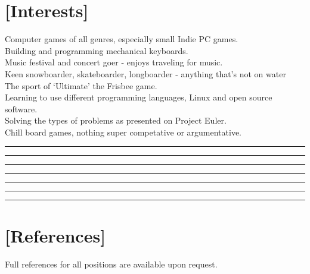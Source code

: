 \documentclass[a4paper]{res}
\newcommand{\setrule}[1]{\rule{#1}{1mm}}
\newcommand{\fibrule}[2]{ \hspace{#1}  \setrule{#2} \setrule{21mm} \setrule{13mm} \setrule{8mm} \setrule{5mm} \setrule{3mm} \setrule{2mm}  \vspace{-.52in} }
\begin{document}
\begin{resume}
\section{[Interests]} 
\vspace{-.15in}

Computer games of all genres, especially small Indie PC games.\\
Building and programming mechanical keyboards.\\
Music festival and concert goer - enjoys traveling for music. \\
Keen snowboarder, skateboarder, longboarder - anything that's not on water \\
The sport of `Ultimate' the Frisbee game. \\
Learning to use different programming languages, Linux and open source software.\\
Solving the types of problems as presented on Project Euler. \\
Chill board games, nothing super competative or argumentative.

\fibrule{1.075in}{2.825in}
\section{[References]} 

Full references for all positions are available upon request.


\end{resume}
\end{document}
